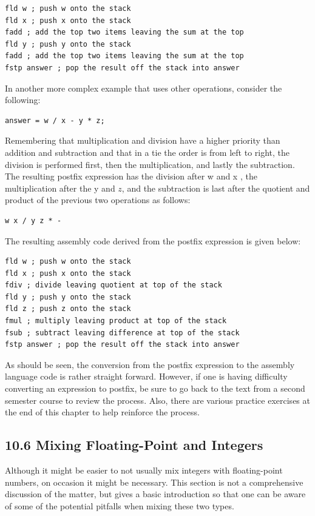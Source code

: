 \documentclass[10pt]{book}
\begin{document}
\begin{verbatim}
fld w ; push w onto the stack
fld x ; push x onto the stack
fadd ; add the top two items leaving the sum at the top
fld y ; push y onto the stack
fadd ; add the top two items leaving the sum at the top
fstp answer ; pop the result off the stack into answer
\end{verbatim}

In another more complex example that uses other operations, consider the following:

\begin{verbatim}
answer = w / x - y * z;
\end{verbatim}

Remembering that multiplication and division have a higher priority than addition and subtraction and that in a tie the order is from left to right, the division is performed first, then the multiplication, and lastly the subtraction. The resulting postfix expression has the division after w and x , the multiplication after the y and $z$, and the subtraction is last after the quotient and product of the previous two operations as follows:

\begin{verbatim}
w x / y z * -
\end{verbatim}

The resulting assembly code derived from the postfix expression is given below:

\begin{verbatim}
fld w ; push w onto the stack
fld x ; push x onto the stack
fdiv ; divide leaving quotient at top of the stack
fld y ; push y onto the stack
fld z ; push z onto the stack
fmul ; multiply leaving product at top of the stack
fsub ; subtract leaving difference at top of the stack
fstp answer ; pop the result off the stack into answer
\end{verbatim}

As should be seen, the conversion from the postfix expression to the assembly language code is rather straight forward. However, if one is having difficulty converting an expression to postfix, be sure to go back to the text from a second semester course to review the process. Also, there are various practice exercises at the end of this chapter to help reinforce the process.

\subsection*{10.6 Mixing Floating-Point and Integers}
Although it might be easier to not usually mix integers with floating-point numbers, on occasion it might be necessary. This section is not a comprehensive discussion of the matter, but gives a basic introduction so that one can be aware of some of the potential pitfalls when mixing these two types.
\end{document}
